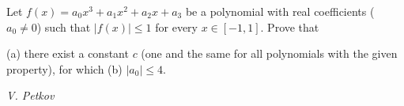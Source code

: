 Let $f(x)=a_0x^3+a_1x^2+a_2x+a_3$ be a polynomial with real coefficients ($a_0\ne0$) such that $|f(x)|\le1$ for every $x\in[-1,1]$. Prove that

(a) there exist a constant $c$ (one and the same for all polynomials with the given property), for which
(b) $|a_0|\le4$.

\textit{V. Petkov}